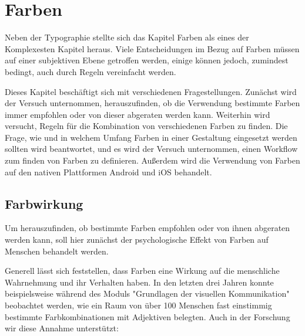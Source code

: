 
\chapter{Farben} %

\label{Farben} %



Neben der Typographie stellte sich das Kapitel Farben als eines der Komplexesten Kapitel heraus. Viele Entscheidungen im Bezug auf Farben müssen auf einer subjektiven Ebene getroffen werden, einige können jedoch, zumindest bedingt, auch durch Regeln vereinfacht werden.

Dieses Kapitel beschäftigt sich mit verschiedenen Fragestellungen. Zunächst wird der Versuch unternommen, herauszufinden, ob die Verwendung bestimmte Farben immer empfohlen oder von dieser abgeraten werden kann.
Weiterhin wird versucht, Regeln für die Kombination von verschiedenen Farben zu finden. Die Frage, wie und in welchem Umfang Farben in einer Gestaltung eingesetzt werden sollten wird beantwortet, und es wird der Versuch unternommen, einen Workflow zum finden von Farben zu definieren. Außerdem wird die Verwendung von Farben auf den nativen Plattformen Android und iOS behandelt.


\section{Farbwirkung}

Um herauszufinden, ob bestimmte Farben empfohlen oder von ihnen abgeraten werden kann, soll hier zunächst der psychologische Effekt von Farben auf Menschen behandelt werden.

Generell lässt sich feststellen, dass Farben eine Wirkung auf die menschliche Wahrnehmung und ihr Verhalten haben. In den letzten drei Jahren konnte beispielsweise während des Moduls "Grundlagen der visuellen Kommunikation" beobachtet werden, wie ein Raum von über 100 Menschen fast einstimmig bestimmte Farbkombinationen mit Adjektiven belegten. Auch in der Forschung wir diese Annahme unterstützt:

